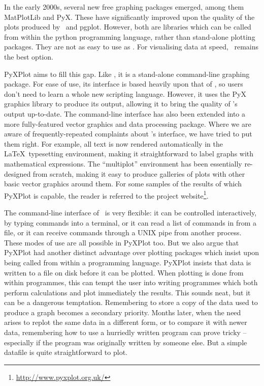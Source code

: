 In the early 2000s, several new free graphing packages emerged, among them {\sc
MatPlotLib} and {\sc PyX}.  These have
significantly improved upon the quality of the plots produced by \gnuplot\ and
pgplot. However, both are libraries which can be called from within the python
programming language, rather than stand-alone plotting packages. They are not
as easy to use as \gnuplot.  For visualising data at speed, \gnuplot\ remains the
best option.

{\sc PyXPlot} aims to fill this gap. Like \gnuplot, it is a stand-alone
command-line graphing package. For ease of use, its interface is based heavily
upon that of \gnuplot, so users don't need to learn a whole new scripting
language. However, it uses the PyX graphics library to produce its output,
allowing it to bring the quality of \gnuplot's output up-to-date.  The
command-line interface has also been extended into a more fully-featured vector
graphics and data processing package.  Where we are aware of
frequently-repeated complaints about \gnuplot's interface, we have tried to put
them right.  For example, all text is now rendered automatically in the \LaTeX\
typesetting environment, making it straightforward to label graphs with
mathematical expressions. The ``multiplot'' environment has been essentially
re-designed from scratch, making it easy to produce galleries of plots with
other basic vector graphics around them.  For some samples of the results of
which PyXPlot is capable, the reader is referred to the project
website\footnote{\url{http://www.pyxplot.org.uk/}}.

The command-line interface of \gnuplot\ is very flexible: it can be controlled
interactively, by typing commands into a terminal, or it can read a list of
commands in from a file, or it can receive commands through a UNIX pipe from
another process. These modes of use are all possible in PyXPlot too.  But we
also argue that PyXPlot had another distinct advantage over plotting packages
which insist upon being called from within a programming language. PyXPlot
insists that data is written to a file on disk before it can be plotted. When
plotting is done from within programmes, this can tempt the user into writing
programmes which both perform calculations and plot immediately the results.
This sounds neat, but it can be a dangerous temptation. Remembering to store a
copy of the data used to produce a graph becomes a secondary priority.  Months
later, when the need arises to replot the same data in a different form, or to
compare it with newer data, remembering how to use a hurriedly written program
can prove tricky -- especially if the program was originally written by someone
else. But a simple datafile is quite straightforward to plot.


